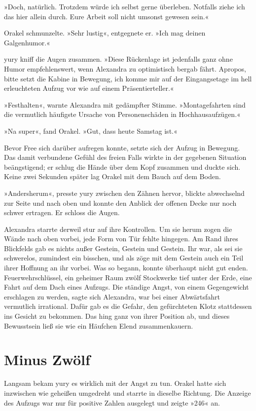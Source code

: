 »Doch, natürlich. Trotzdem würde ich selbst gerne überleben. Notfalls ziehe ich das hier allein durch. Eure Arbeit soll nicht umsonst gewesen sein.«

Orakel schmunzelte. »Sehr lustig«, entgegnete er. »Ich mag deinen Galgenhumor.«

yury kniff die Augen zusammen. »Diese Rückenlage ist jedenfalls ganz ohne Humor empfehlenswert, wenn Alexandra zu optimistisch bergab fährt. Apropos, bitte setzt die Kabine in Bewegung, ich komme mir auf der Eingangsetage im hell erleuchteten Aufzug vor wie auf einem Präsentierteller.«

»Festhalten«, warnte Alexandra mit gedämpfter Stimme. »Montagefahrten sind die vermutlich häufigste Ursache von Personenschäden in Hochhausaufzügen.«

»Na super«, fand Orakel. »Gut, dass heute Samstag ist.«

Bevor Free sich darüber aufregen konnte, setzte sich der Aufzug in Bewegung. Das damit verbundene Gefühl des freien Falls wirkte in der gegebenen Situation beängstigend; er schlug die Hände über dem Kopf zusammen und duckte sich. Keine zwei Sekunden später lag Orakel mit dem Bauch auf dem Boden.

»Andersherum«, presste yury zwischen den Zähnen hervor, blickte abwechselnd zur Seite und nach oben und konnte den Anblick der offenen Decke nur noch schwer ertragen. Er schloss die Augen.

Alexandra starrte derweil stur auf ihre Kontrollen. Um sie herum zogen die Wände nach oben vorbei, jede Form von Tür fehlte hingegen. Am Rand ihres Blickfelds gab es nichts außer Gestein, Gestein und Gestein. Ihr war, als sei sie schwerelos, zumindest ein bisschen, und als zöge mit dem Gestein auch ein Teil ihrer Hoffnung an ihr vorbei. Was so begann, konnte überhaupt nicht gut enden. Feuerwehrschlüssel, ein geheimer Raum zwölf Stockwerke tief unter der Erde, eine Fahrt auf dem Dach eines Aufzugs. Die ständige Angst, von einem Gegengewicht erschlagen zu werden, sagte sich Alexandra, war bei einer Abwärtsfahrt vermutlich irrational. Dafür gab es die Gefahr, den gefürchteten Klotz stattdessen ins Gesicht zu bekommen. Das hing ganz von ihrer Position ab, und dieses Bewusstsein ließ sie wie ein Häufchen Elend zusammenkauern.


\chapter{Minus Zwölf}

Langsam bekam yury es wirklich mit der Angst zu tun. Orakel hatte sich inzwischen wie geheißen umgedreht und starrte in dieselbe Richtung. Die Anzeige des Aufzugs war nur für positive Zahlen ausgelegt und zeigte »246« an.


